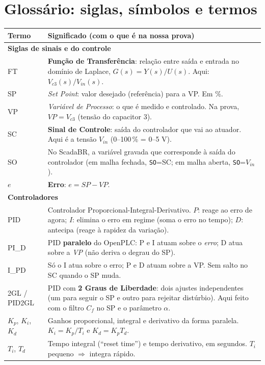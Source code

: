 \documentclass[11pt,a4paper]{article}
\newcommand{\Vc}[1]{V_{c#1}}
\newcommand{\Vin}{V_{in}}
\begin{document}
\section{Glossário: siglas, símbolos e termos}\label{gloss}
\begin{center}\small
\renewcommand{\arraystretch}{1.35}
\begin{longtable}{p{2.7cm}p{12.3cm}}
\toprule \textbf{Termo} & \textbf{Significado (com o que é na nossa prova)}\\\midrule\endhead
\multicolumn{2}{l}{\textbf{Siglas de sinais e do controle}}\\
FT & \textbf{Função de Transferência}: relação entre saída e entrada no domínio de Laplace, $G(s)=Y(s)/U(s)$. Aqui: $\Vc3(s)/\Vin(s)$.\\
SP & \emph{Set Point}: valor desejado (referência) para a VP. Em \%.\\
VP & \emph{Variável de Processo}: o que é medido e controlado. Na prova, $VP=\Vc3$ (tensão do capacitor 3).\\
SC & \textbf{Sinal de Controle}: saída do controlador que vai ao atuador. Aqui é a tensão $\Vin$ (0--100\,\% = 0--5 V).\\
SO & No ScadaBR, a variável gravada que corresponde à saída do controlador (em malha fechada, \texttt{SO}=SC; em malha aberta, \texttt{SO}=$\Vin$).\\
$e$ & \textbf{Erro}: $e=SP-VP$.\\
\multicolumn{2}{l}{\textbf{Controladores}}\\
PID & Controlador Proporcional-Integral-Derivativo. $P$: reage ao erro de agora; $I$: elimina o erro em regime (soma o erro no tempo); $D$: antecipa (reage à rapidez da variação).\\
PI\_D & PID \textbf{paralelo} do OpenPLC: P e I atuam sobre o \emph{erro}; D atua sobre a \emph{VP} (não deriva o degrau do SP).\\
I\_PD & Só o I atua sobre o erro; P e D atuam sobre a VP. Sem salto no SC quando o SP muda.\\
2GL / PID2GL & PID com \textbf{2 Graus de Liberdade}: dois ajustes independentes (um para seguir o SP e outro para rejeitar distúrbio). Aqui feito com o filtro $C_f$ no SP e o parâmetro $\alpha$.\\
$K_p$, $K_i$, $K_d$ & Ganhos proporcional, integral e derivativo da forma paralela. $K_i=K_p/T_i$ e $K_d=K_pT_d$.\\
$T_i$, $T_d$ & Tempo integral (``reset time'') e tempo derivativo, em segundos. $T_i$ pequeno $\Rightarrow$ integra rápido.\\

\end{longtable}
\end{center}
\end{document}
